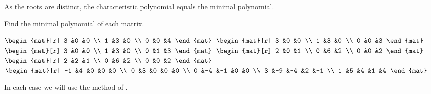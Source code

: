 \begin{exercises}
\begin{answer}
       As the roots are distinct, the characteristic polynomial equals the
       minimal polynomial. 
     \end{answer}
  \recommended \item 
    Find the minimal polynomial of each matrix.
    \begin{exparts*}
       \partsitem \( \begin{mat}[r]
                   3  &0  &0  \\
                   1  &3  &0  \\
                   0  &0  &4
                \end{mat} \)
       \partsitem \( \begin{mat}[r]
                   3  &0  &0  \\
                   1  &3  &0  \\
                   0  &0  &3
                \end{mat} \)
       \partsitem \( \begin{mat}[r]
                   3  &0  &0  \\
                   1  &3  &0  \\
                   0  &1  &3
                \end{mat} \)
       \partsitem \( \begin{mat}[r]
                   2  &0  &1  \\
                   0  &6  &2  \\
                   0  &0  &2
                \end{mat} \)
       \partsitem \( \begin{mat}[r]
                   2  &2  &1  \\
                   0  &6  &2  \\
                   0  &0  &2
                \end{mat} \)
       \partsitem \( \begin{mat}[r]
                   -1 &4  &0  &0  &0  \\
                    0 &3  &0  &0  &0  \\
                    0 &-4 &-1 &0  &0  \\
                    3 &-9 &-4 &2  &-1 \\
                    1 &5  &4  &1  &4
                \end{mat} \)
    \end{exparts*}
    \begin{answer}
      In each case we will use the method of .

\end{answer}
\end{exercises}
